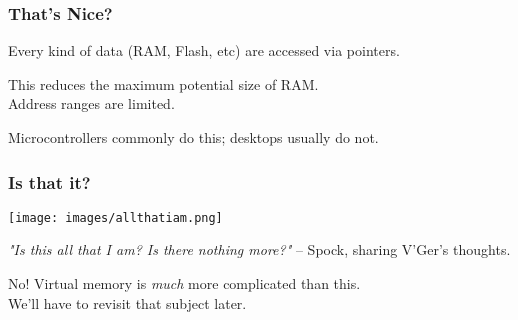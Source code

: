 \begin{frame}
\frametitle{That's Nice?}

Every kind of data (RAM, Flash, etc) are accessed via pointers.

This reduces the maximum potential size of RAM.\\
\quad Address ranges are limited.

Microcontrollers commonly do this; desktops usually do not.

\end{frame}

\begin{frame}
\frametitle{Is that it?}

\begin{center}
  \texttt{[image: images/allthatiam.png]}
\end{center}\vspace{-2em}
  \textit{"Is this all that I am? Is there nothing more?"} -- Spock, sharing V'Ger's thoughts.

No! Virtual memory is \textit{much} more complicated than this.\\
\quad We'll have to revisit that subject later.

\end{frame}



